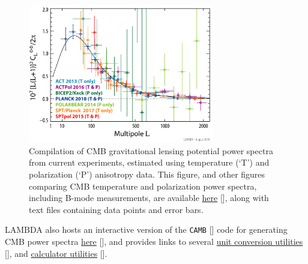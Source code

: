 \documentclass[twocolumn,tighten]{aastex631}
\begin{document}
\begin{figure}[t!]
    \centering
    \includegraphics[width=3.2in]{fig_1}
    \caption{Compilation of CMB gravitational lensing potential power spectra from current experiments, estimated using temperature (`T') and polarization (`P') anisotropy data. This figure, and other figures comparing CMB temperature and polarization power spectra, including B-mode measurements, are available \href{https://lambda.gsfc.nasa.gov/graphics/}{here} [], along with text files containing data points and error bars.}
    \label{fig:bandpower}
\end{figure}

LAMBDA also hosts an interactive version of the \texttt{CAMB} [] code for generating CMB power spectra  \href{https://lambda.gsfc.nasa.gov/toolbox/camb_online.html}{here} [], and provides links to several  \href{https://lambda.gsfc.nasa.gov/toolbox/converters.html}{unit conversion utilities} [], and \href{https://lambda.gsfc.nasa.gov/toolbox/calculators.html}{calculator utilities} [].
\end{document}
